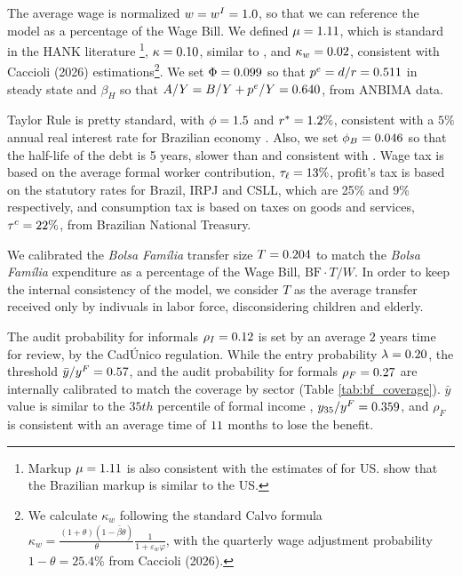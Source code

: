\documentclass[12pt]{article}
\begin{document}


The average wage is normalized $w=w^I=1.0$, so that we can reference the model as a
percentage of the Wage Bill. We defined $\mu = 1.11$, which is standard in the HANK
literature \parencite{kaplan2018monetary,auclert2025fiscal}\footnote{
    Markup $\mu=1.11$ is also consistent with the estimates of \textcite{basu1997returns}
    for US. \textcite{de2021quantifying} show that the Brazilian markup is similar to the US.},
$\kappa = 0.10$, similar to \textcite{kaplan2018monetary}, and $\kappa_w = 0.02$,
consistent with Caccioli (2026) estimations\footnote{ We calculate $\kappa_w$ following
the standard Calvo formula
$\kappa_w = \frac{(1+\theta)(1-\bar \beta \theta)}{\theta} \frac{1}{1 + \varepsilon_w \varphi}$,
with the quarterly wage adjustment probability $1 - \theta = 25.4\%$ from Caccioli
(2026). }. We set $\Phi = 0.099$ so that $p^e = d/r = 0.511$ in steady state and
$\beta_H$ so that $A/Y = B/Y + p^e/Y = 0.640$, from ANBIMA data.

Taylor Rule is pretty standard, with $\phi=1.5$ and $r^* = 1.2\%$, consistent
with a $5\%$ annual real interest rate for Brazilian economy \parencite{dos2024natural}.
Also, we set $\phi_B = 0.046$ so that the half-life of the debt is 5 years, slower
than \textcite{auclert2025fiscal} and consistent with \textcite{campos2019alert}. Wage
tax is based on the average formal worker contribution, $\tau_\ell = 13\%$, profit's
tax is based on the statutory rates for Brazil, IRPJ and CSLL, which are 25\% and 9\%
respectively, and consumption tax is based on taxes on goods and services,
$\tau^c = 22\%$, from Brazilian National Treasury.

We calibrated the \textit{Bolsa Família} transfer size $T = 0.204$ to match the
\textit{Bolsa Família} expenditure as a percentage of the Wage Bill,
$\text{BF} \cdot T / W$. In order to keep the internal consistency of the model, we
consider $T$ as the average transfer received only by indivuals in labor force,
disconsidering children and elderly.

The audit probability for informals $\rho_I = 0.12$ is set by an average $2$ years
time for review, by the CadÚnico regulation. While the entry probability
$\lambda = 0.20$, the threshold $\bar y / y^F = 0.57$, and the audit probability
for formals $\rho_F = 0.27$ are internally calibrated to match the coverage by sector
(Table \ref{tab:bf_coverage}). $\bar y$ value is similar to the $35th$ percentile of
formal income \parencite{ferriere2025heterogeneous}, $y_{35} / y^F = 0.359$,
and $\rho_F$ is consistent with an average time of $11$ months to lose the
benefit.
\end{document}

